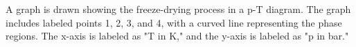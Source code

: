 A graph is drawn showing the freeze-drying process in a p-T diagram. The graph includes labeled points 1, 2, 3, and 4, with a curved line representing the phase regions. The x-axis is labeled as "T in K," and the y-axis is labeled as "p in bar."